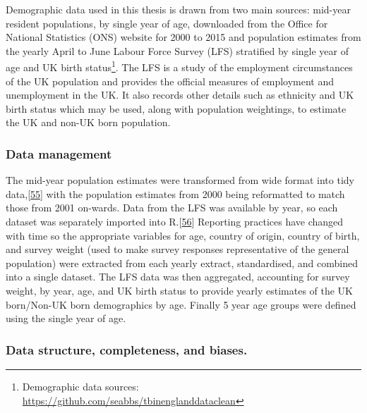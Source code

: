 \documentclass[11pt,twoside]{bristolthesis}
\begin{document}
  Demographic data used in this thesis is drawn from two main sources: mid-year resident populations, by single year of age, downloaded from the Office for National Statistics (ONS) website for 2000 to 2015 and population estimates from the yearly April to June Labour Force Survey (LFS) stratified by single year of age and UK birth status\footnote{Demographic data sources: \url{https://github.com/seabbs/tbinenglanddataclean}}. The LFS is a study of the employment circumstances of the UK population and provides the official measures of employment and unemployment in the UK. It also records other details such as ethnicity and UK birth status which may be used, along with population weightings, to estimate the UK and non-UK born population.
  
  \hypertarget{data-management}{%
  \subsubsection{Data management}\label{data-management}}
  
  The mid-year population estimates were transformed from wide format into tidy data,{[}\protect\hyperlink{ref-Wickham2015}{55}{]} with the population estimates from 2000 being reformatted to match those from 2001 on-wards. Data from the LFS was available by year, so each dataset was separately imported into R.{[}\protect\hyperlink{ref-R}{56}{]} Reporting practices have changed with time so the appropriate variables for age, country of origin, country of birth, and survey weight (used to make survey responses representative of the general population) were extracted from each yearly extract, standardised, and combined into a single dataset. The LFS data was then aggregated, accounting for survey weight, by year, age, and UK birth status to provide yearly estimates of the UK born/Non-UK born demographics by age. Finally 5 year age groups were defined using the single year of age.
  
  \hypertarget{data-structure-completeness-and-biases.}{%
  \subsubsection{Data structure, completeness, and biases.}\label{data-structure-completeness-and-biases.}}
  
\end{document}
